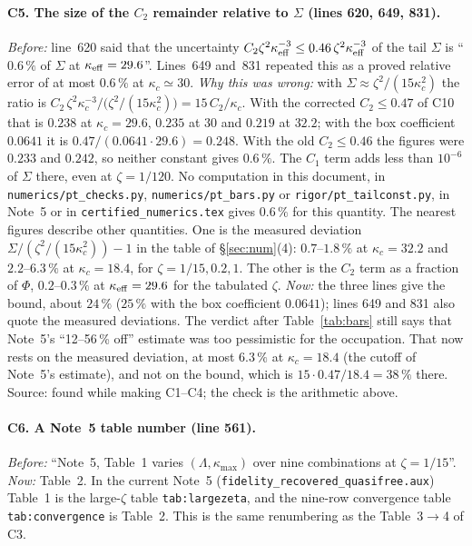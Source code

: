 \documentclass[11pt]{article}
\begin{document}
\paragraph{C5. The size of the $C_2$ remainder relative to $\Sigma$ (lines 620, 649, 831).}
\emph{Before:} line~620 said that the uncertainty
$C_2\zeta^2\kappa_{\rm eff}^{-3}\le0.46\,\zeta^2\kappa_{\rm eff}^{-3}$ of the tail $\Sigma$ is
``$0.6\,\%$ of $\Sigma$ at $\kappa_{\rm eff}=29.6$''.  Lines~649 and~831 repeated this as a proved
relative error of at most $0.6\,\%$ at $\kappa_c\simeq30$.
\emph{Why this was wrong:} with $\Sigma\approx\zeta^2/(15\kappa_c^2)$ the ratio is
$C_2\,\zeta^2\kappa_c^{-3}\big/\bigl(\zeta^2/(15\kappa_c^2)\bigr)=15\,C_2/\kappa_c$.  With the
corrected $C_2\le0.47$ of C10 that is $0.238$ at $\kappa_c=29.6$, $0.235$ at $30$ and $0.219$ at
$32.2$; with the box coefficient $0.0641$ it is $0.47/(0.0641\cdot29.6)=0.248$.  With the old
$C_2\le0.46$ the figures were $0.233$ and $0.242$, so neither constant gives $0.6\,\%$.  The $C_1$ term adds less than $10^{-6}$ of $\Sigma$ there, even
at $\zeta=1/120$.  No computation in this document, in \texttt{numerics/pt\_checks.py},
\texttt{numerics/pt\_bars.py} or \texttt{rigor/pt\_tailconst.py}, in Note~5 or in
\texttt{certified\_numerics.tex} gives $0.6\,\%$ for this quantity.  The nearest figures describe
other quantities.  One is the measured deviation $\Sigma/(\zeta^2/(15\kappa_c^2))-1$ in the table of
\S\ref{sec:num}(4): $0.7$--$1.8\,\%$ at $\kappa_c=32.2$ and $2.2$--$6.3\,\%$ at $\kappa_c=18.4$, for
$\zeta=1/15,0.2,1$.  The other is the $C_2$ term as a fraction of $\Phi$, $0.2$--$0.3\,\%$ at
$\kappa_{\rm eff}=29.6$ for the tabulated $\zeta$.
\emph{Now:} the three lines give the bound, about $24\,\%$ ($25\,\%$ with the box coefficient
$0.0641$); lines 649 and 831 also quote the measured deviations.  The verdict after
Table~\ref{tab:bars} still says that Note~5's ``12--56\,\% off'' estimate was too pessimistic for the
occupation.  That now rests on the measured deviation, at most $6.3\,\%$ at $\kappa_c=18.4$ (the
cutoff of Note~5's estimate), and not on the bound, which is $15\cdot0.47/18.4=38\,\%$ there.  Source: found while making C1--C4; the check is the arithmetic above.

\paragraph{C6. A Note~5 table number (line 561).}
\emph{Before:} ``Note~5, Table~1 varies $(\Lambda,\kappa_{\max})$ over nine combinations at
$\zeta=1/15$''.  \emph{Now:} Table~2.  In the current Note~5 (\texttt{fidelity\_recovered\_quasifree.aux})
Table~1 is the large-$\zeta$ table \texttt{tab:largezeta}, and the nine-row convergence table
\texttt{tab:convergence} is Table~2.  This is the same renumbering as the Table~3$\to$4 of C3.
\end{document}
